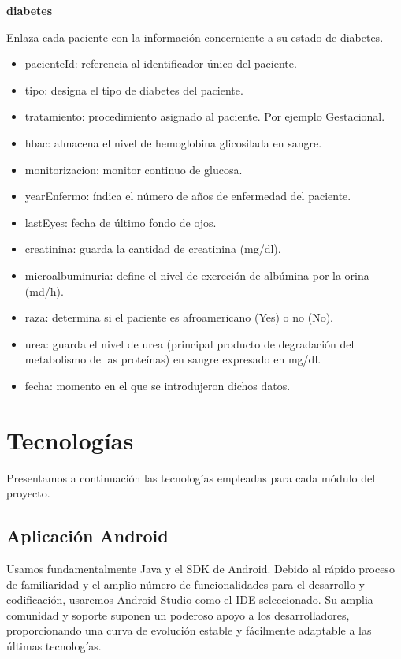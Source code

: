 \documentclass[11pt,spanish,
		listoftables,listoffigures]
		{tfgplantilla}
\begin{document}
\noindent
\textbf {diabetes}

Enlaza cada paciente con la información concerniente a su estado de diabetes.
\begin{itemize}
	\item pacienteId: referencia al identificador único del paciente. 
	\item tipo: designa el tipo de diabetes del paciente.
	\item tratamiento: procedimiento asignado al paciente. Por ejemplo Gestacional.
	\item hbac: almacena el nivel de hemoglobina glicosilada en sangre.
	\item monitorizacion: monitor continuo de glucosa.
	\item yearEnfermo: índica el número de años de enfermedad del paciente.
	\item lastEyes: fecha de último fondo de ojos.
	\item creatinina: guarda la cantidad de creatinina (mg/dl).
	\item microalbuminuria: define el nivel de excreción de albúmina por la orina (md/h).
	\item raza: determina si el paciente es afroamericano (Yes) o no (No).
	\item urea: guarda el nivel de urea (principal producto de degradación del metabolismo de las proteínas) en sangre expresado en mg/dl.
	\item fecha: momento en el que se introdujeron dichos datos.	
\end{itemize}

\chapter{Tecnolog\'ias}

Presentamos a continuación las tecnologías empleadas para cada módulo del proyecto. 

\section {Aplicación Android}

Usamos fundamentalmente Java y el SDK de Android. Debido al rápido proceso de familiaridad y el amplio número de funcionalidades para el desarrollo y codificación, usaremos Android Studio como el IDE seleccionado. Su amplia comunidad y soporte suponen un poderoso apoyo a los desarrolladores, proporcionando una curva de evolución estable y fácilmente adaptable a las últimas tecnologías.
\end{document}
